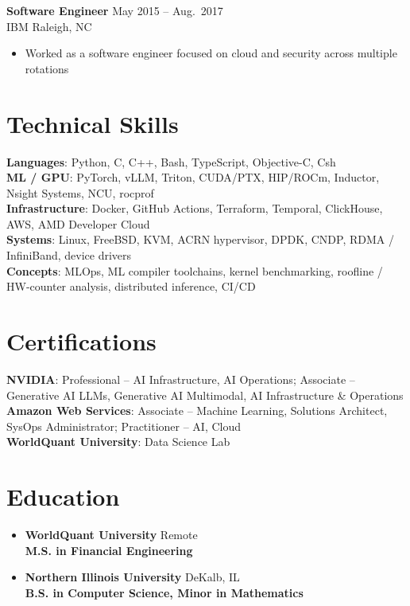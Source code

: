 \documentclass[letterpaper,10pt]{article}
\newcommand{\job}[4]{%
  \textbf{#1} \hfill #2\\
  #3 \hfill #4\vspace{-2pt}}
\begin{document}
\job{Software Engineer}{May 2015 -- Aug.\ 2017}{IBM}{Raleigh, NC}
\begin{itemize}
  \item Worked as a software engineer focused on cloud and security across multiple rotations
\end{itemize}

\section{Technical Skills}
\textbf{Languages}: Python, C, C++, Bash, TypeScript, Objective-C, Csh\\
\textbf{ML / GPU}: PyTorch, vLLM, Triton, CUDA/PTX, HIP/ROCm, Inductor, Nsight Systems, NCU, rocprof\\
\textbf{Infrastructure}: Docker, GitHub Actions, Terraform, Temporal, ClickHouse, AWS, AMD Developer Cloud\\
\textbf{Systems}: Linux, FreeBSD, KVM, ACRN hypervisor, DPDK, CNDP, RDMA / InfiniBand, device drivers\\
\textbf{Concepts}: MLOps, ML compiler toolchains, kernel benchmarking, roofline / HW-counter analysis, distributed inference, CI/CD

\section{Certifications}
\textbf{NVIDIA}: Professional -- AI Infrastructure, AI Operations; Associate -- Generative AI LLMs, Generative AI Multimodal, AI Infrastructure \& Operations\\
\textbf{Amazon Web Services}: Associate -- Machine Learning, Solutions Architect, SysOps Administrator; Practitioner -- AI, Cloud\\
\textbf{WorldQuant University}: Data Science Lab

\section{Education}
\begin{itemize}[leftmargin=1em,label={}]
  \item \textbf{WorldQuant University} \hfill Remote\\ \textbf{M.S. in Financial Engineering}

  \item \textbf{Northern Illinois University} \hfill DeKalb, IL\\ \textbf{B.S. in Computer Science, Minor in Mathematics}
\end{itemize}
\end{document}
